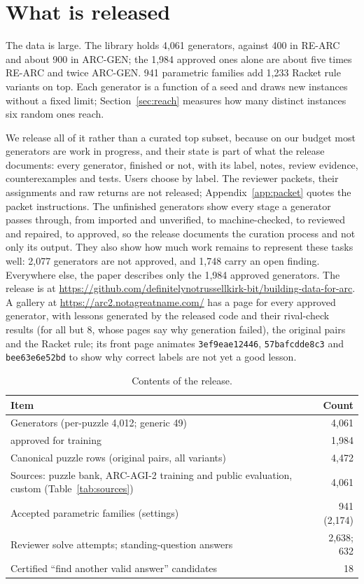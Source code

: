 \documentclass[11pt]{article}
\newcommand{\gen}[1]{\texttt{#1}}
\begin{document}
\section{What is released}
\label{sec:release}

The data is large. The library holds 4,061 generators, against 400 in RE-ARC
and about 900 in ARC-GEN; the 1,984 approved ones alone are about five times
RE-ARC and twice ARC-GEN. 941 parametric families add 1,233 Racket rule
variants on top. Each generator is a function of a seed and draws new
instances without a fixed limit; Section~\ref{sec:reach} measures how many
distinct instances six random ones reach.

We release all of it rather than a curated top subset, because on our budget
most generators are work in progress, and their state is part of what the
release documents: every generator, finished or not, with its label, notes, review evidence, counterexamples and
tests. Users choose by label. The reviewer packets, their assignments and raw
returns are not released; Appendix~\ref{app:packet} quotes the packet
instructions. The unfinished generators show every stage a
generator passes through, from imported and unverified, to machine-checked, to
reviewed and repaired, to approved, so the release documents the curation
process and not only its output. They also show how much work remains to
represent these tasks well: 2,077 generators are not approved, and 1,748 carry
an open finding. Everywhere else, the paper describes only the 1,984 approved generators.
The release is at \url{https://github.com/definitelynotrussellkirk-bit/building-data-for-arc}.
A gallery at \url{https://arc2.notagreatname.com/} has a page for every
approved generator, with lessons generated by the released code and their
rival-check results (for all but 8, whose pages say why generation failed),
the original pairs and the Racket rule; its front page
animates \gen{3ef9eae12446}, \gen{57bafcdde8c3} and \gen{bee63e6e52bd} to show
why correct labels are not yet a good lesson.

\begin{table}[H]
\centering
\small
\begin{tabularx}{\linewidth}{Xr}
\toprule
Item & Count \\
\midrule
Generators (per-puzzle 4,012; generic 49) & 4,061 \\
\quad approved for training & 1,984 \\
Canonical puzzle rows (original pairs, all variants) & 4,472 \\
Sources: puzzle bank, ARC-AGI-2 training and public evaluation, custom (Table~\ref{tab:sources}) & 4,061 \\
Accepted parametric families (settings) & 941 (2,174) \\
Reviewer solve attempts; standing-question answers & 2,638; 632 \\
Certified ``find another valid answer'' candidates & 18 \\
\bottomrule
\end{tabularx}
\caption{Contents of the release.}
\label{tab:release}
\end{table}
\end{document}
